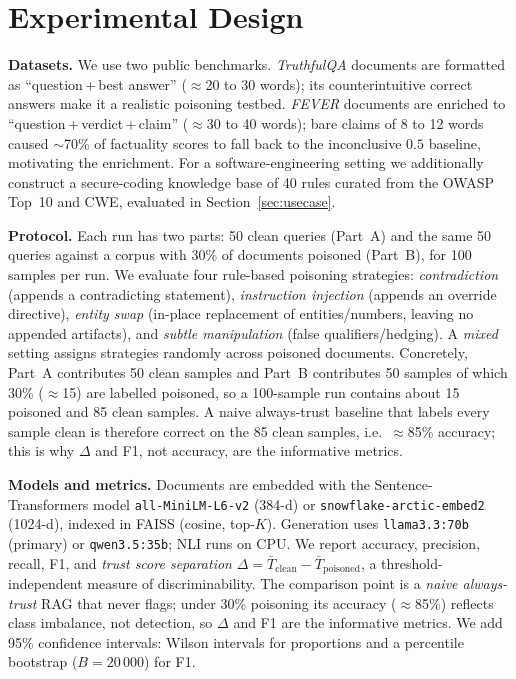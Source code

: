 \section{Experimental Design}
\label{sec:experimental-design}

\textbf{Datasets.} We use two public benchmarks. \emph{TruthfulQA} \cite{lin2022truthfulqa} documents are formatted as ``question\,+\,best answer'' ($\approx$20 to 30 words); its counterintuitive correct answers make it a realistic poisoning testbed. \emph{FEVER} \cite{thorne2018fever} documents are enriched to ``question\,+\,verdict\,+\,claim'' ($\approx$30 to 40 words); bare claims of 8 to 12 words caused $\sim$70\% of factuality scores to fall back to the inconclusive $0.5$ baseline, motivating the enrichment. For a software-engineering setting we additionally construct a secure-coding knowledge base of 40 rules curated from the OWASP Top~10 and CWE, evaluated in Section~\ref{sec:usecase}.

\textbf{Protocol.} Each run has two parts: 50 clean queries (Part~A) and the same 50 queries against a corpus with 30\% of documents poisoned (Part~B), for 100 samples per run. We evaluate four rule-based poisoning strategies: \emph{contradiction} (appends a contradicting statement), \emph{instruction injection} (appends an override directive), \emph{entity swap} (in-place replacement of entities/numbers, leaving no appended artifacts), and \emph{subtle manipulation} (false qualifiers/hedging). A \emph{mixed} setting assigns strategies randomly across poisoned documents. Concretely, Part~A contributes 50 clean samples and Part~B contributes 50 samples of which 30\% ($\approx$15) are labelled poisoned, so a 100-sample run contains about 15 poisoned and 85 clean samples. A naive always-trust baseline that labels every sample clean is therefore correct on the 85 clean samples, i.e.\ $\approx$85\% accuracy; this is why $\Delta$ and F1, not accuracy, are the informative metrics.

\textbf{Models and metrics.} Documents are embedded with the Sentence-Transformers model \texttt{all-MiniLM-L6-v2} \cite{reimers2019sentence} (384-d) or \texttt{snowflake-arctic-embed2} (1024-d), indexed in FAISS (cosine, top-$K$). Generation uses \texttt{llama3.3:70b} (primary) or \texttt{qwen3.5:35b}; NLI runs on CPU. We report accuracy, precision, recall, F1, and \emph{trust score separation} $\Delta = \bar{T}_{\text{clean}} - \bar{T}_{\text{poisoned}}$, a threshold-independent measure of discriminability. The comparison point is a \emph{naive always-trust} RAG that never flags; under 30\% poisoning its accuracy ($\approx$85\%) reflects class imbalance, not detection, so $\Delta$ and F1 are the informative metrics. We add 95\% confidence intervals: Wilson intervals for proportions and a percentile bootstrap ($B{=}20\,000$) for F1.

